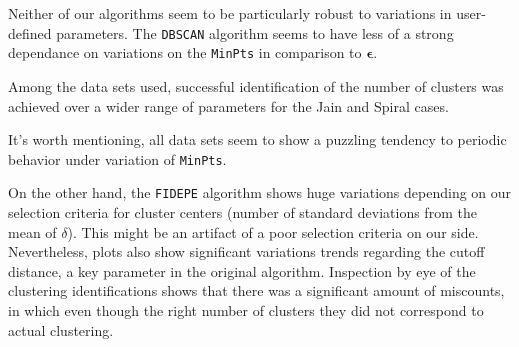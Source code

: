 \documentclass[12pt]{article}
\begin{document}
\par Neither of our algorithms seem to be particularly robust to variations in user-defined parameters. The \texttt{DBSCAN} algorithm seems to have less of a strong dependance on variations on the \texttt{MinPts} in comparison to $\boldsymbol{\epsilon}$. 
\par Among the data sets used, successful identification of the number of clusters was achieved over a wider range of parameters for the Jain and Spiral cases.
\par It's worth mentioning, all data sets seem to show a puzzling tendency to periodic behavior under variation of \texttt{MinPts}. 
\par On the other hand, the \texttt{FIDEPE} algorithm shows huge variations depending on our selection criteria for cluster centers (number of standard deviations from the mean of $\delta$). This might be an artifact of a poor selection criteria on our side. Nevertheless, plots also show significant variations trends regarding the cutoff distance, a key parameter in the original algorithm. Inspection by eye of the clustering identifications shows that there was a significant amount of miscounts, in which even though the right number of clusters they did not correspond to actual clustering.


%
%
%
%
\clearpage


\end{document}
